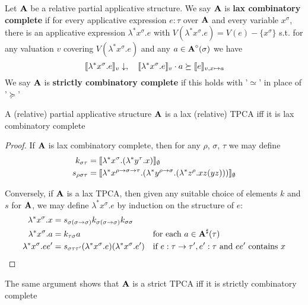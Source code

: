 \documentclass[11pt]{article}
\begin{document}
\begin{definition}[]
Let \(\operatorname{\textbf{A}}\) be a relative partial applicative structure. We say \(\operatorname{\textbf{A}}\) is \textbf{lax combinatory complete}
if for every applicative expression \(e:\tau\) over \(\operatorname{\textbf{A}}\) and every variable \(x^\sigma\), there is an
applicative expression \(\lambda^*x^\sigma.e\) with \(V(\lambda^*x^\sigma.e)=V(e)-\{x^\sigma\}\) s.t. for any valuation \(v\)
covering \(V(\lambda^*x^\sigma.e)\) and any \(a\in\operatorname{\textbf{A}}^\circ(\sigma)\) we have
\begin{equation*}
\llbracket \lambda^*x^\sigma.e \rrbracket_v\downarrow,\quad\llbracket \lambda^*x^\sigma.e \rrbracket_v\cdot a\succeq\llbracket e \rrbracket_{v,x\mapsto a}
\end{equation*}
We say \(\operatorname{\textbf{A}}\) is \textbf{strictly combinatory complete} if this holds with '\(\simeq\)' in place of '\(\succeq\)'
\end{definition}

\begin{theorem}[]
\label{3.3.3}
A (relative) partial applicative structure \(\operatorname{\textbf{A}}\) is a lax (relative) TPCA iff it is lax
combinatory complete
\end{theorem}

\begin{proof}
If \(\operatorname{\textbf{A}}\) is lax combinatory complete, then for any \(\rho\), \(\sigma\), \(\tau\) we may define
\begin{align*}
k_{\sigma\tau}&=\llbracket \lambda^*x^\sigma.(\lambda^*y^\tau.x) \rrbracket_\emptyset\\
s_{\rho\sigma\tau}&=\llbracket \lambda^*x^{\rho\to\sigma\to\tau}.(\lambda^*y^{\rho\to\sigma}.(\lambda^*z^\rho.xz(yz))) \rrbracket_\emptyset
\end{align*}

Conversely, if \(\operatorname{\textbf{A}}\) is a lax TPCA, then given any suitable choice of elements \(k\) and \(s\)
for \(\operatorname{\textbf{A}}\), we may define \(\lambda^*x^\sigma.e\) by induction on the structure of \(e\):
\begin{align*}
\lambda^*x^\sigma.x&=s_{\sigma(\sigma\to\sigma)}k_{\sigma(\sigma\to\sigma)}k_{\sigma\sigma}&&\\
\lambda^*x^\sigma.a&=k_{\tau\sigma}a&&\text{for each }a\in\operatorname{\textbf{A}}^\sharp(\tau)\\
\lambda^*x^\sigma.ee'&=s_{\sigma\tau\tau'}(\lambda^*x^\sigma.e)(\lambda^*x^\sigma.e')&&\text{if }e:\tau\to\tau',e':\tau\text{ and }ee'\text{ contains }x
\end{align*}
\end{proof}

The same argument shows that \(\operatorname{\textbf{A}}\) is a strict TPCA iff it is strictly combinatory complete
\end{document}

